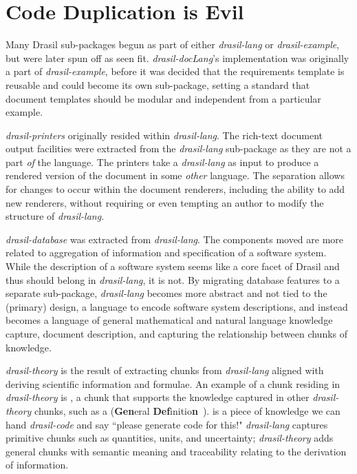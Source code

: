 \chapter{Code Duplication is Evil}\label{ci}

Many Drasil sub-packages begun as part of either \textit{drasil-lang} or \textit{drasil-example}, but were later spun off as seen fit. \textit{drasil-docLang}'s implementation was originally a part of \textit{drasil-example}, before it was decided that the requirements template is reusable and could become its own sub-package, setting a standard that document templates should be modular and independent from a particular example.

\textit{drasil-printers} originally resided within \textit{drasil-lang}. The rich-text document output facilities were extracted from the \textit{drasil-lang} sub-package as they are not a part \textit{of} the language. The printers take a \textit{drasil-lang}  as input to produce a rendered version of the document in some \textit{other} language. The separation allows for changes to occur within the document renderers, including the ability to add new renderers, without requiring or even tempting an author to modify the  structure of \textit{drasil-lang}.

\textit{drasil-database} was extracted from \textit{drasil-lang}. The components moved are more related to aggregation of information and specification of a software system. While the description of a software system seems like a core facet of Drasil and thus should belong in \textit{drasil-lang}, it is not. By migrating database features to a separate sub-package, \textit{drasil-lang} becomes more abstract and not tied to the (primary) design, a language to encode software system descriptions, and instead becomes a language of general mathematical and natural language knowledge capture, document description, and capturing the relationship between chunks of knowledge.

\textit{drasil-theory} is the result of extracting chunks from \textit{drasil-lang} aligned with deriving scientific information and formulae. An example of a chunk residing in \textit{drasil-theory} is , a chunk that supports the knowledge captured in other \textit{drasil-theory} chunks, such as a  (\textbf{Gen}eral \textbf{Def}initio\textbf{n}~\cite{smith2005new}).  is a piece of knowledge we can hand \textit{drasil-code} and say ``please generate code for this!" \textit{drasil-lang} captures primitive chunks such as quantities, units, and uncertainty; \textit{drasil-theory} adds general chunks with semantic meaning and traceability relating to the derivation of information.


